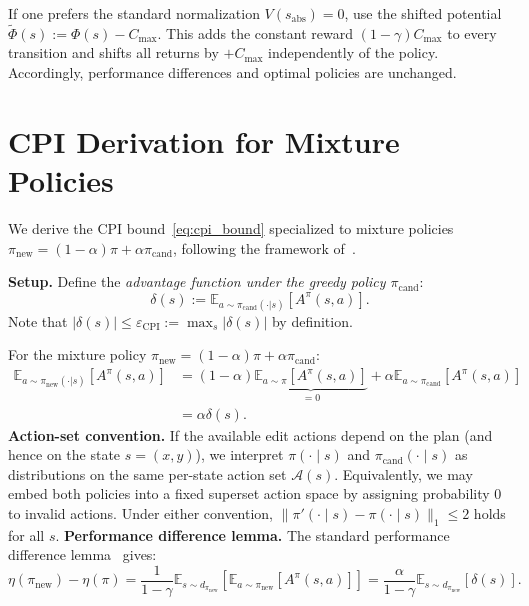 \documentclass{article}
\theoremstyle{plain}
\theoremstyle{definition}
\theoremstyle{remark}
\newcommand{\E}{\mathbb{E}}
\newcommand{\AAcal}{\mathcal{A}}
\begin{document}
If one prefers the standard normalization $V(s_{\mathrm{abs}})=0$, use the shifted potential
$\tilde{\Phi}(s):=\Phi(s)-C_{\max}$.
This adds the constant reward $(1-\gamma)C_{\max}$ to every transition and shifts all returns by $+C_{\max}$ independently of the policy.
Accordingly, performance differences and optimal policies are unchanged.

\section{CPI Derivation for Mixture Policies}
\label{app:cpi_derivation}

We derive the CPI bound~\eqref{eq:cpi_bound} specialized to mixture policies $\pi_{\mathrm{new}} = (1-\alpha)\pi + \alpha\pi_{\mathrm{cand}}$, following the framework of~\citet{KakadeLangford2002}.

\textbf{Setup.}
Define the \emph{advantage function under the greedy policy $\pi_{\mathrm{cand}}$}:
\begin{equation}
\delta(s) := \E_{a \sim \pi_{\mathrm{cand}}(\cdot|s)}[A^\pi(s,a)].
\end{equation}
Note that $|\delta(s)| \le \varepsilon_{\mathrm{CPI}} := \max_s |\delta(s)|$ by definition.

For the mixture policy $\pi_{\mathrm{new}} = (1-\alpha)\pi + \alpha\pi_{\mathrm{cand}}$:
\begin{align}
\E_{a \sim \pi_{\mathrm{new}}(\cdot|s)}[A^\pi(s,a)]
&= (1-\alpha)\underbrace{\E_{a \sim \pi}[A^\pi(s,a)]}_{=0} + \alpha \E_{a \sim \pi_{\mathrm{cand}}}[A^\pi(s,a)] \\
&= \alpha \delta(s).
\end{align}
\textbf{Action-set convention.}
If the available edit actions depend on the plan (and hence on the state $s=(x,y)$), we interpret $\pi(\cdot\mid s)$ and
$\pi_{\mathrm{cand}}(\cdot\mid s)$ as distributions on the same per-state action set $\AAcal(s)$.
Equivalently, we may embed both policies into a fixed superset action space by assigning probability $0$ to invalid actions.
Under either convention, $\|\pi'(\cdot\mid s)-\pi(\cdot\mid s)\|_1\le 2$ holds for all $s$.
\textbf{Performance difference lemma.}
The standard performance difference lemma~\citep{KakadeLangford2002} gives:
\begin{equation}
\eta(\pi_{\mathrm{new}}) - \eta(\pi) = \frac{1}{1-\gamma} \E_{s \sim d_{\pi_{\mathrm{new}}}}[\E_{a \sim \pi_{\mathrm{new}}}[A^\pi(s,a)]] = \frac{\alpha}{1-\gamma} \E_{s \sim d_{\pi_{\mathrm{new}}}}[\delta(s)].
\end{equation}
\end{document}
